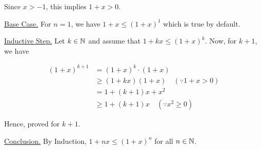 \bs
Since $x > -1$, this implies $1 + x > 0$.

\underline{Base Case.} For $n = 1$, we have $1 + x \leq (1 + x)^1$ which is true by default.

\underline{Inductive Step.} Let $k \in \mathbb{N}$ and assume that $1+kx \leq (1+x)^k$. Now, for $k+1$, we have

\begin{align*}
	(1+x)^{k+1} &= (1+x)^k \cdot (1+x) \\
							&\geq (1+kx)(1+x) \quad ( \because 1+x > 0 ) \\
							&= 1+(k+1)x + x^2 \\
							&\geq 1+(k+1)x \quad ( \because x^2 \geq 0 )
\end{align*}

Hence, proved for $k+1$.

\underline{Conclusion.} By Induction, $1+nx \leq (1+x)^n$ for all $n \in \mathbb{N}$.

\es
